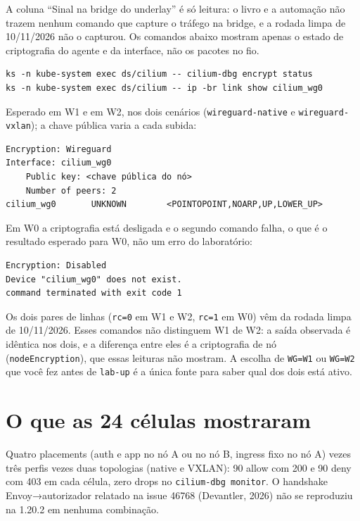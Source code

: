 \documentclass[12pt,openany,oneside,a4paper,chapter=TITLE,english,brazil]{abntex2}
\begin{document}
A coluna ``Sinal na bridge do underlay'' é só leitura: o livro e a automação não
trazem nenhum comando que capture o tráfego na bridge, e a rodada limpa de
10/11/2026 não o capturou. Os comandos abaixo mostram apenas o estado de
criptografia do agente e da interface, não os pacotes no fio.

\begin{verbatim}
ks -n kube-system exec ds/cilium -- cilium-dbg encrypt status
ks -n kube-system exec ds/cilium -- ip -br link show cilium_wg0
\end{verbatim}

Esperado em W1 e em W2, nos dois cenários (\texttt{wireguard-{}\allowbreak{}native} e
\texttt{wireguard-{}\allowbreak{}vxlan}); a chave pública varia a cada subida:

\begin{verbatim}
Encryption: Wireguard
Interface: cilium_wg0
    Public key: <chave pública do nó>
    Number of peers: 2
cilium_wg0       UNKNOWN        <POINTOPOINT,NOARP,UP,LOWER_UP>
\end{verbatim}

Em W0 a criptografia está desligada e o segundo comando falha, o que é o
resultado esperado para W0, não um erro do laboratório:

\begin{verbatim}
Encryption: Disabled
Device "cilium_wg0" does not exist.
command terminated with exit code 1
\end{verbatim}

Os dois pares de linhas (\texttt{rc=\allowbreak{}0} em W1 e W2, \texttt{rc=\allowbreak{}1} em W0) vêm da rodada limpa de
10/11/2026. Esses comandos não distinguem W1 de W2: a saída observada é idêntica nos
dois, e a diferença entre eles é a criptografia de nó (\texttt{node\allowbreak{}Encryption}), que
essas leituras não mostram. A escolha de \texttt{WG=\allowbreak{}W1} ou \texttt{WG=\allowbreak{}W2} que você fez antes
de \texttt{lab-{}\allowbreak{}up} é a única fonte para saber qual dos dois está ativo.

\section{O que as 24 células mostraram}\label{o-que-as-24-cuxe9lulas-mostraram}

Quatro placements (auth e app no nó A ou no nó B, ingress fixo no nó A) vezes
três perfis vezes duas topologias (native e VXLAN): 90 allow com 200 e 90 deny
com 403 em cada célula, zero drops no \texttt{cilium-{}\allowbreak{}dbg monitor}. O handshake
Envoy→autorizador relatado na issue 46768 (Devantler, 2026) não se reproduziu na 1.20.2 em nenhuma
combinação.
\end{document}
